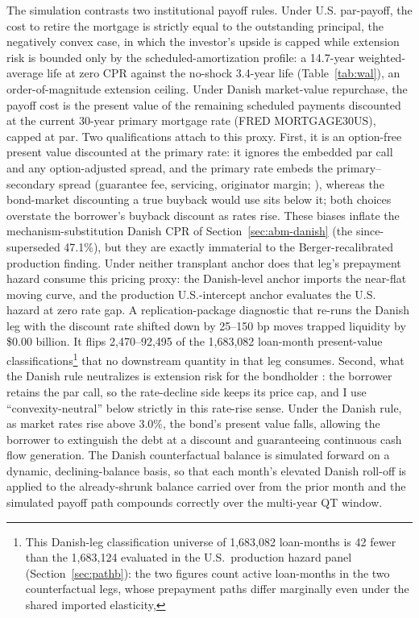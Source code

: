 \documentclass[12pt]{article}
\begin{document}
The simulation contrasts two institutional payoff rules. Under U.S. par-payoff, the cost to retire the mortgage is strictly equal to the outstanding principal, the negatively convex case, in which the investor's upside is capped while extension risk is bounded only by the scheduled-amortization profile: a 14.7-year weighted-average life at zero CPR against the no-shock 3.4-year life (Table~\ref{tab:wal}), an order-of-magnitude extension ceiling. Under Danish market-value repurchase, the payoff cost is the present value of the remaining scheduled payments discounted at the current 30-year primary mortgage rate (FRED MORTGAGE30US), capped at par. Two qualifications attach to this proxy. First, it is an option-free present value discounted at the primary rate: it ignores the embedded par call and any option-adjusted spread, and the primary rate embeds the primary--secondary spread (guarantee fee, servicing, originator margin; \citealp{fuster2013}), whereas the bond-market discounting a true buyback would use sits below it; both choices overstate the borrower's buyback discount as rates rise. These biases inflate the mechanism-substitution Danish CPR of Section~\ref{sec:abm-danish} (the since-superseded 47.1\%), but they are exactly immaterial to the Berger-recalibrated production finding. Under neither transplant anchor does that leg's prepayment hazard consume this pricing proxy: the Danish-level anchor imports the near-flat moving curve, and the production U.S.-intercept anchor evaluates the U.S. hazard at zero rate gap. A replication-package diagnostic that re-runs the Danish leg with the discount rate shifted down by 25--150 bp moves trapped liquidity by \$0.00 billion. It flips 2,470--92,495 of the 1,683,082 loan-month present-value classifications\footnote{This Danish-leg classification universe of 1{,}683{,}082 loan-months is 42 fewer than the 1{,}683{,}124 evaluated in the U.S.\ production hazard panel (Section~\ref{sec:pathb}): the two figures count active loan-months in the two counterfactual legs, whose prepayment paths differ marginally even under the shared imported elasticity,} that no downstream quantity in that leg consumes. Second, what the Danish rule neutralizes is extension risk for the bondholder \citep{berger2026}: the borrower retains the par call, so the rate-decline side keeps its price cap, and I use ``convexity-neutral'' below strictly in this rate-rise sense. Under the Danish rule, as market rates rise above 3.0\%, the bond's present value falls, allowing the borrower to extinguish the debt at a discount and guaranteeing continuous cash flow generation. The Danish counterfactual balance is simulated forward on a dynamic, declining-balance basis, so that each month's elevated Danish roll-off is applied to the already-shrunk balance carried over from the prior month and the simulated payoff path compounds correctly over the multi-year QT window.
\end{document}
